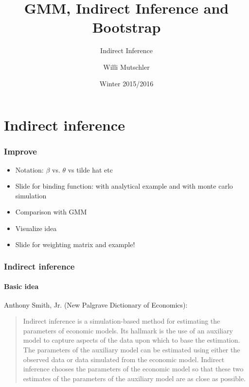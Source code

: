 \documentclass{beamer}
\begin{document}
\title{GMM, Indirect Inference and Bootstrap}
\subtitle{Indirect Inference}
\author[Willi Mutschler]{Willi Mutschler}
\date{Winter 2015/2016}
\maketitle

\section{Indirect inference}

\begin{frame}\frametitle{Improve}
  \begin{itemize}
    \item Notation: $\beta$ vs. $\theta$ vs tilde hat etc
    \item Slide for binding function: with analytical example and with monte carlo simulation
    \item Comparison with GMM
    \item Visualize idea
    \item Slide for weighting matrix and example!
  \end{itemize}
\end{frame}


\begin{frame}\frametitle{Indirect inference}\framesubtitle{Basic idea}
Anthony Smith, Jr. (New Palgrave Dictionary of Economics):
\begin{quote}
Indirect inference is a \color{red} simulation-based \color{black} method for estimating the parameters of \color{red} economic models\color{black}. Its hallmark is the use of an \color{red} auxiliary model \color{black} to capture aspects of the data upon which to base the estimation. The parameters of the auxiliary model can be estimated using either the \color{red} observed data \color{black} or \color{red} data simulated \color{black} from the economic model. Indirect inference chooses the parameters of the economic model so that these two estimates of the parameters of the auxiliary model are \color{red} as close as possible\color{black}.
\end{quote}
\end{frame}
\end{document}
